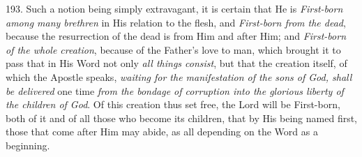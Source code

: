 193. Such a notion being
simply extravagant, it is certain that He is \emph{First-born among many
brethren} in His relation to the flesh, and \emph{First-born from the
dead}, because the resurrection of the dead is from Him and after
Him; and \emph{First-born of the whole creation}, because of the
Father's love to man, which brought it to pass that in His Word not
only \emph{all things consist}, but that the creation itself, of which
the Apostle speaks, \emph{waiting for the manifestation of the sons of
God, shall be delivered} one time \emph{from the bondage of corruption
into the glorious liberty of the children of God}. Of this creation
thus set free, the Lord will be First-born, both of it and of all
those who become its children, that by His being named first, those
that come after Him may abide, as all depending on the Word as a
beginning.

